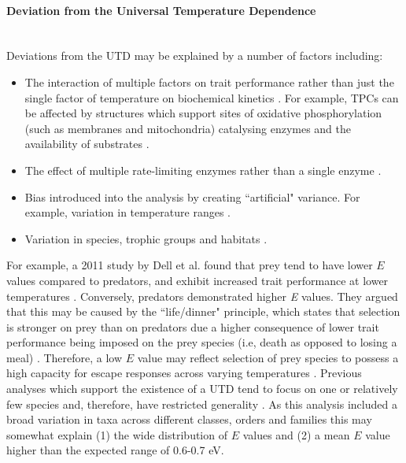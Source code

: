 \documentclass[11pt]{article}
\begin{document}
\begin{flushleft}
\paragraph{Deviation from the Universal Temperature Dependence}\mbox{}\\
Deviations from the UTD may be explained by a number of factors including:
\begin{itemize}
    \item The interaction of multiple factors on trait performance rather than just the single factor of temperature on biochemical kinetics \citep{kontopoulos2020adaptive}. For example, TPCs can be affected by structures which support sites of oxidative phosphorylation (such as membranes and mitochondria) catalysing enzymes and the availability of substrates \citep{delong2018habitat}.
    \item The effect of multiple rate-limiting enzymes rather than a single enzyme \citep{pawar2016real}.
    \item Bias introduced into the analysis by creating “artificial" variance. For example, variation in temperature ranges \citep{pawar2016real}. 
    \item Variation in species, trophic groups and habitats \citep{dell2011systematic,huey2011variation}. 
\end{itemize}
For example, a 2011 study by Dell et al. found that prey tend to have lower $E$ values compared to predators, and exhibit increased trait performance at lower temperatures \citep{dell2011systematic}. Conversely, predators demonstrated higher \emph{E} values. They argued that this may be caused by the “life/dinner" principle, which states that selection is stronger on prey than on predators due a higher consequence of lower trait performance being imposed on the prey species (i.e, death as opposed to losing a meal) \citep{dell2011systematic}. Therefore, a low $E$ value may reflect selection of prey species to possess a high capacity for escape responses across varying temperatures \citep{dell2011systematic,huey2011variation}. Previous analyses which support the existence of a UTD tend to focus on one or relatively few species and, therefore, have restricted generality \citep{huey2011variation}. As this analysis included a broad variation in taxa across different classes, orders and families this may somewhat explain (1) the wide distribution of \emph{$E$} values and (2) a mean \emph{$E$} value higher than the expected range of 0.6-0.7 eV.
\newline 


\end{flushleft}
\end{document}
